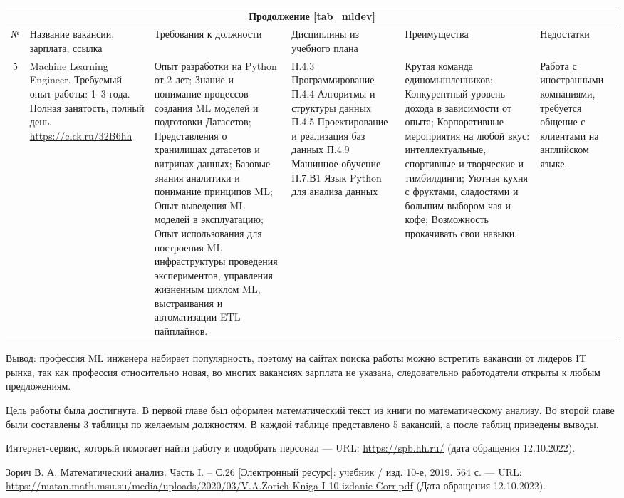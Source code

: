 \documentclass[14pt]{extreport}
\begin{document}
\begin{landscape}
\begin{table}[H]
	\begin{tabular}{|c|p{3.3cm}|p{6cm}|p{4.7cm}|p{5.5cm}|p{3.5cm}|}
	\multicolumn{6}{c}{Продолжение \ref{tab_mldev}} \\
	\hline № & {Название вакансии, зарплата, ссылка} & {Требования к должности} & {Дисциплины из учебного плана} & {Преимущества} & {Недостатки} \\
 	\hline 5 & {Machine Learning Engineer.
Требуемый опыт работы: 1–3 года.
Полная занятость, полный день. \url{https://clck.ru/32B6hh}} & {Опыт разработки на Python от 2 лет; Знание и понимание процессов создания ML моделей и подготовки Датасетов; Представления о хранилищах датасетов и витринах данных; Базовые знания аналитики и понимание принципов ML; Опыт выведения ML моделей в эксплуатацию;
Опыт использования для построения ML инфраструктуры проведения экспериментов, управления жизненным циклом ML, выстраивания и автоматизации ETL пайплайнов.} & {П.4.3 Программирование
П.4.4 Алгоритмы и структуры данных
П.4.5 Проектирование и реализация баз данных
П.4.9 Машинное обучение
П.7.В1 Язык Python для анализа данных} & {Крутая команда единомышленников;
Конкурентный уровень дохода в зависимости от опыта; Корпоративные мероприятия на любой вкус: интеллектуальные, спортивные и творческие и тимбилдинги;
Уютная кухня с фруктами, сладостями и большим выбором чая и кофе; Возможность прокачивать свои навыки.} & {Работа с иностранными компаниями, требуется общение с клиентами на английском языке.} \\
	\hline
	\end{tabular}
\end{table}

Вывод: профессия ML инженера набирает популярность, поэтому на сайтах поиска работы можно встретить вакансии от лидеров IT рынка, так как профессия относительно новая, во многих вакансиях зарплата не указана, следовательно работодатели открыты к любым предложениям. 
\end{landscape}

\conclusions

Цель работы была достигнута. В первой главе был оформлен математический текст из книги по математическому анализу. Во второй главе были составлены 3 таблицы по желаемым должностям. В каждой таблице представлено 5 вакансий, а после таблиц приведены выводы.

\newpage
\begin{thebibliography}{99}

Интернет-сервис, который помогает найти работу и подобрать персонал — URL: \url{https://spb.hh.ru/} (дата обращения 12.10.2022).	

Зорич В. А. Математический анализ. Часть I. – С.26 [Электронный ресурс]: учебник / изд. 10-е, 2019. 564 с. — URL: \url{https://matan.math.msu.su/media/uploads/2020/03/V.A.Zorich-Kniga-I-10-izdanie-Corr.pdf} (Дата обращения 12.10.2022).
	
\end{thebibliography}
\end{document}
